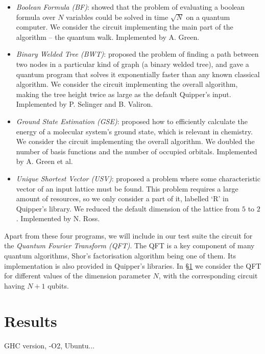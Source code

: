 \begin{itemize}
\item \textit{Boolean Formula (BF)}: \citet{BFWalk} showed that the problem of evaluating a boolean formula over \(N\) variables could be solved in time \(\sqrt{N}\) on a quantum computer. We consider the circuit implementing the main part of the algorithm -- the quantum walk. Implemented by A. Green.

\item \textit{Binary Welded Tree (BWT)}: \citet{BWT} proposed the problem of finding a path between two nodes in a particular kind of graph (a binary welded tree), and gave a quantum program that solves it exponentially faster than any known classical algorithm. We consider the circuit implementing the overall algorithm, making the tree height twice as large as the default Quipper's input. Implemented by P. Selinger and B. Valiron.

\item \textit{Ground State Estimation (GSE)}: \citet{GSE} proposed how to efficiently calculate the energy of a molecular system's ground state, which is relevant in chemistry. We consider the circuit implementing the overall algorithm. We doubled the number of basis functions and the number of occupied orbitals. Implemented by A. Green et al.

\item \textit{Unique Shortest Vector (USV)}: \citet{USV} proposed a problem where some characteristic vector of an input lattice must be found. This problem requires a large amount of resources, so we only consider a part of it, labelled `R' in Quipper's library. We reduced the default dimension of the lattice from \(5\) to \(2\). Implemented by N. Ross.
\end{itemize}

Apart from these four programs, we will include in our test suite the circuit for the \textit{Quantum Fourier Transform (QFT)}. The QFT is a key component of many quantum algorithms, Shor's factorisation algorithm being one of them. Its implementation is also provided in Quipper's libraries. In \S\ref{Results} we consider the QFT for different values of the dimension parameter \(N\), with the corresponding circuit having \(N+1\) qubits.

\section{Results}
\label{Results}

GHC version, -O2, Ubuntu...

